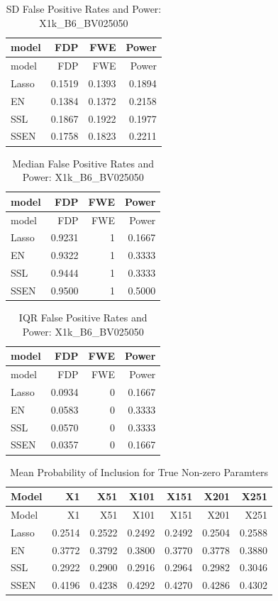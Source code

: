 \documentclass[
]{article}
\begin{document}
\begin{longtable}[]{@{}lrrr@{}}
\caption{SD False Positive Rates and Power:
X1k\_B6\_BV025050}\tabularnewline
\toprule
model & FDP & FWE & Power \\
\midrule
\endfirsthead
\toprule
model & FDP & FWE & Power \\
\midrule
\endhead
Lasso & 0.1519 & 0.1393 & 0.1894 \\
EN & 0.1384 & 0.1372 & 0.2158 \\
SSL & 0.1867 & 0.1922 & 0.1977 \\
SSEN & 0.1758 & 0.1823 & 0.2211 \\
\bottomrule
\end{longtable}

\begin{longtable}[]{@{}lrrr@{}}
\caption{Median False Positive Rates and Power:
X1k\_B6\_BV025050}\tabularnewline
\toprule
model & FDP & FWE & Power \\
\midrule
\endfirsthead
\toprule
model & FDP & FWE & Power \\
\midrule
\endhead
Lasso & 0.9231 & 1 & 0.1667 \\
EN & 0.9322 & 1 & 0.3333 \\
SSL & 0.9444 & 1 & 0.3333 \\
SSEN & 0.9500 & 1 & 0.5000 \\
\bottomrule
\end{longtable}

\begin{longtable}[]{@{}lrrr@{}}
\caption{IQR False Positive Rates and Power:
X1k\_B6\_BV025050}\tabularnewline
\toprule
model & FDP & FWE & Power \\
\midrule
\endfirsthead
\toprule
model & FDP & FWE & Power \\
\midrule
\endhead
Lasso & 0.0934 & 0 & 0.1667 \\
EN & 0.0583 & 0 & 0.3333 \\
SSL & 0.0570 & 0 & 0.3333 \\
SSEN & 0.0357 & 0 & 0.1667 \\
\bottomrule
\end{longtable}

\begin{longtable}[]{@{}lrrrrrr@{}}
\caption{Mean Probability of Inclusion for True Non-zero
Paramters}\tabularnewline
\toprule
Model & X1 & X51 & X101 & X151 & X201 & X251 \\
\midrule
\endfirsthead
\toprule
Model & X1 & X51 & X101 & X151 & X201 & X251 \\
\midrule
\endhead
Lasso & 0.2514 & 0.2522 & 0.2492 & 0.2492 & 0.2504 & 0.2588 \\
EN & 0.3772 & 0.3792 & 0.3800 & 0.3770 & 0.3778 & 0.3880 \\
SSL & 0.2922 & 0.2900 & 0.2916 & 0.2964 & 0.2982 & 0.3046 \\
SSEN & 0.4196 & 0.4238 & 0.4292 & 0.4270 & 0.4286 & 0.4302 \\
\bottomrule
\end{longtable}
\end{document}
